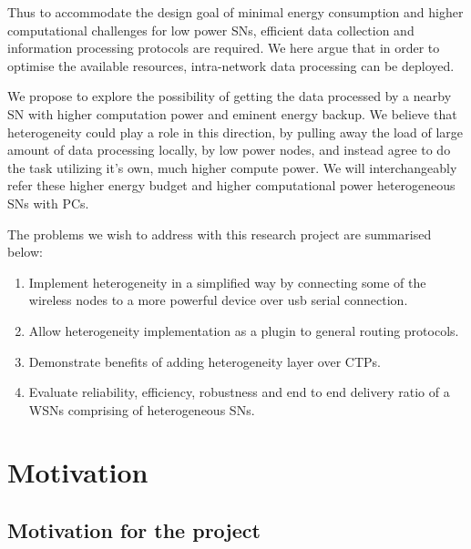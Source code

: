 \par
Thus to accommodate the design goal of minimal energy consumption and higher computational challenges for low power \acp{SN}, efficient data collection and information processing protocols are required. We here argue that in order to optimise the available resources, intra-network data processing can be deployed.

\par 
We propose to explore the possibility of getting the data processed by a nearby \ac{SN} with higher computation power and eminent energy backup. We believe that heterogeneity could play a role in this direction, by pulling away the load of large amount of data processing locally, by low power nodes, and instead agree to do the task utilizing it’s own, much higher compute power. We will interchangeably refer these higher energy budget and higher computational power heterogeneous \acp{SN} with \acp{PC}.

The problems we wish to address with this research project are summarised below:

\begin{enumerate}
    
    \item Implement heterogeneity in a simplified way by connecting some of the wireless nodes to a more powerful device over usb serial connection.
    
    \item Allow heterogeneity implementation as a plugin to general routing protocols.
    
    \item Demonstrate benefits of adding heterogeneity layer over \acp{CTP}.
    
    \item Evaluate reliability, efficiency, robustness and end to end delivery ratio of a \acp{WSN} comprising of heterogeneous \acp{SN}.
    
\end{enumerate}

\section{Motivation}

    \subsection*{Motivation for the project}
    
